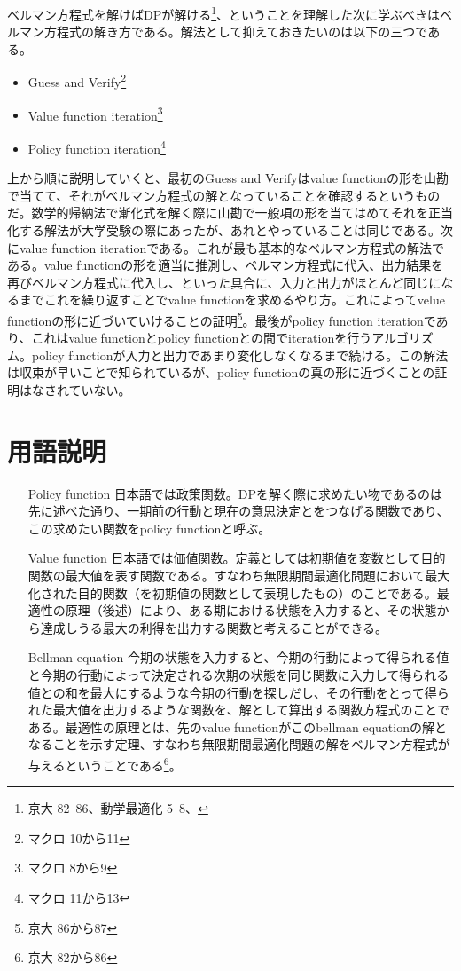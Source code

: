 \documentclass{jsarticle}
\begin{document}
ベルマン方程式を解けばDPが解ける\footnote{京大 82~86、動学最適化 5~8、}、ということを理解した次に学ぶべきはベルマン方程式の解き方である。解法として抑えておきたいのは以下の三つである。
\begin{itemize}
\item Guess and Verify\footnote{マクロ 10から11}
\item Value function iteration\footnote{マクロ 8から9}
\item Policy function iteration\footnote{マクロ 11から13}
\end{itemize}
上から順に説明していくと、最初のGuess and Verifyはvalue functionの形を山勘で当てて、それがベルマン方程式の解となっていることを確認するというものだ。数学的帰納法で漸化式を解く際に山勘で一般項の形を当てはめてそれを正当化する解法が大学受験の際にあったが、あれとやっていることは同じである。次にvalue function iterationである。これが最も基本的なベルマン方程式の解法である。value functionの形を適当に推測し、ベルマン方程式に代入、出力結果を再びベルマン方程式に代入し、といった具合に、入力と出力がほとんど同じになるまでこれを繰り返すことでvalue functionを求めるやり方。これによってvelue functionの形に近づいていけることの証明\footnote{京大 86から87}。最後がpolicy function iterationであり、これはvalue functionとpolicy functionとの間でiterationを行うアルゴリズム。policy functionが入力と出力であまり変化しなくなるまで続ける。この解法は収束が早いことで知られているが、policy functionの真の形に近づくことの証明はなされていない。

\section{用語説明}
\begin{itemize}
\setlength{\leftskip}{2.0cm}
\item[Policy function]  日本語では政策関数。DPを解く際に求めたい物であるのは先に述べた通り、一期前の行動と現在の意思決定とをつなげる関数であり、この求めたい関数をpolicy functionと呼ぶ。

\item[Value function]  日本語では価値関数。定義としては初期値を変数として目的関数の最大値を表す関数である。すなわち無限期間最適化問題において最大化された目的関数（を初期値の関数として表現したもの）のことである。最適性の原理（後述）により、ある期における状態を入力すると、その状態から達成しうる最大の利得を出力する関数と考えることができる。

\item[Bellman equation]  今期の状態を入力すると、今期の行動によって得られる値と今期の行動によって決定される次期の状態を同じ関数に入力して得られる値との和を最大にするような今期の行動を探しだし、その行動をとって得られた最大値を出力するような関数を、解として算出する関数方程式のことである。最適性の原理とは、先のvalue functionがこのbellman equationの解となることを示す定理、すなわち無限期間最適化問題の解をベルマン方程式が与えるということである\footnote{京大 82から86}。
\end{itemize}
\end{document}
